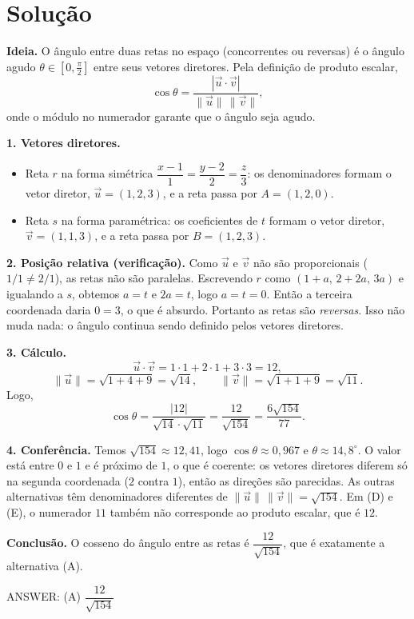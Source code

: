 \documentclass{article}%
\begin{document}
\section*{Solução}

\textbf{Ideia.} O ângulo entre duas retas no espaço (concorrentes ou reversas) é o ângulo agudo $\theta\in\left[0,\frac{\pi}{2}\right]$ entre seus vetores diretores. Pela definição de produto escalar,
\[
\cos\theta=\frac{|\vec u\cdot\vec v|}{\|\vec u\|\,\|\vec v\|},
\]
onde o módulo no numerador garante que o ângulo seja agudo.

\textbf{1. Vetores diretores.}
\begin{itemize}
  \item Reta $r$ na forma simétrica $\dfrac{x-1}{1}=\dfrac{y-2}{2}=\dfrac{z}{3}$: os denominadores formam o vetor diretor, $\vec u=(1,2,3)$, e a reta passa por $A=(1,2,0)$.
  \item Reta $s$ na forma paramétrica: os coeficientes de $t$ formam o vetor diretor, $\vec v=(1,1,3)$, e a reta passa por $B=(1,2,3)$.
\end{itemize}

\textbf{2. Posição relativa (verificação).} Como $\vec u$ e $\vec v$ não são proporcionais ($1/1\neq 2/1$), as retas não são paralelas. Escrevendo $r$ como $(1+a,\,2+2a,\,3a)$ e igualando a $s$, obtemos $a=t$ e $2a=t$, logo $a=t=0$. Então a terceira coordenada daria $0=3$, o que é absurdo. Portanto as retas são \emph{reversas}. Isso não muda nada: o ângulo continua sendo definido pelos vetores diretores.

\textbf{3. Cálculo.}
\[
\vec u\cdot\vec v = 1\cdot 1+2\cdot 1+3\cdot 3 = 12,
\]
\[
\|\vec u\|=\sqrt{1+4+9}=\sqrt{14},\qquad \|\vec v\|=\sqrt{1+1+9}=\sqrt{11}.
\]
Logo,
\[
\cos\theta=\frac{|12|}{\sqrt{14}\cdot\sqrt{11}}=\frac{12}{\sqrt{154}}=\frac{6\sqrt{154}}{77}.
\]

\textbf{4. Conferência.} Temos $\sqrt{154}\approx 12{,}41$, logo $\cos\theta\approx 0{,}967$ e $\theta\approx 14{,}8^\circ$. O valor está entre $0$ e $1$ e é próximo de $1$, o que é coerente: os vetores diretores diferem só na segunda coordenada ($2$ contra $1$), então as direções são parecidas. As outras alternativas têm denominadores diferentes de $\|\vec u\|\,\|\vec v\|=\sqrt{154}$. Em (D) e (E), o numerador $11$ também não corresponde ao produto escalar, que é $12$.

\textbf{Conclusão.} O cosseno do ângulo entre as retas é $\dfrac{12}{\sqrt{154}}$, que é exatamente a alternativa (A).

\medskip
ANSWER: (A) $\dfrac{12}{\sqrt{154}}$
%
\newpage%
\end{document}
